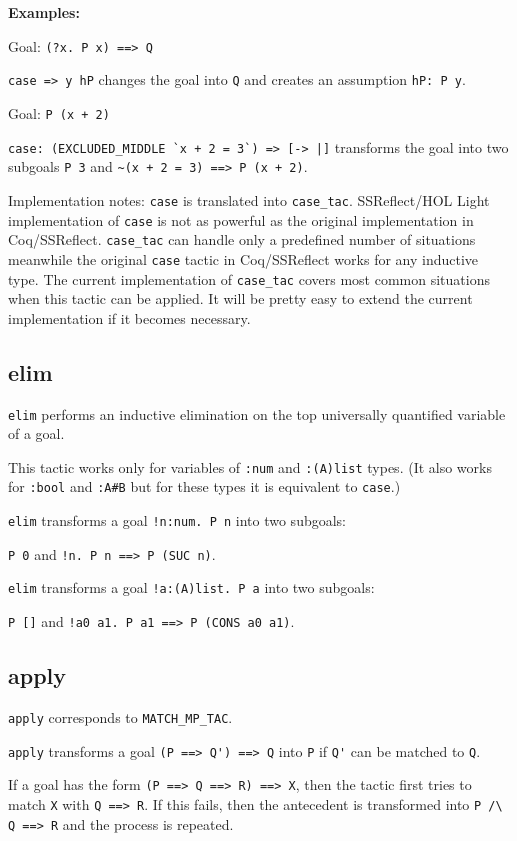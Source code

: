 \documentclass[a4paper]{article}
\begin{document}
{\bf Examples:}

Goal: \verb|(?x. P x) ==> Q|

\verb|case => y hP| changes the goal into \verb|Q| and creates an assumption \verb|hP: P y|.

Goal: \verb|P (x + 2)|

\verb$case: (EXCLUDED_MIDDLE `x + 2 = 3`) => [-> |]$ transforms the goal into two subgoals
\verb|P 3| and \verb|~(x + 2 = 3) ==> P (x + 2)|.

Implementation notes: \verb|case| is translated into \verb|case_tac|. SSReflect/HOL Light implementation of \verb|case| is not as powerful as the original implementation in Coq/SSReflect. \verb|case_tac| can handle only a predefined number of situations meanwhile the original \verb|case| tactic in Coq/SSReflect works for any inductive type. The current implementation of \verb|case_tac| covers most common situations when this tactic can be applied. It will be pretty easy to extend the current implementation if it becomes necessary.


\subsection{elim}
\verb|elim| performs an inductive elimination on the top universally quantified variable of a goal.

This tactic works only for variables of \verb|:num| and \verb|:(A)list| types. (It also works for \verb|:bool| and \verb|:A#B| but for these types it is equivalent to \verb|case|.)

\verb|elim| transforms a goal \verb|!n:num. P n| into two subgoals: 

\verb|P 0| and \verb|!n. P n ==> P (SUC n)|.

\verb|elim| transforms a goal \verb|!a:(A)list. P a| into two subgoals: 

\verb|P []| and \verb|!a0 a1. P a1 ==> P (CONS a0 a1)|.


\subsection{apply}
\verb|apply| corresponds to \verb|MATCH_MP_TAC|.

\verb|apply| transforms a goal \verb|(P ==> Q') ==> Q| into \verb|P| if \verb|Q'| can be matched to \verb|Q|.

If a goal has the form \verb|(P ==> Q ==> R) ==> X|, then the tactic first tries to match \verb|X| with \verb|Q ==> R|. If this fails, then the antecedent is transformed into \verb|P /\ Q ==> R| and the process is repeated.
\end{document}
